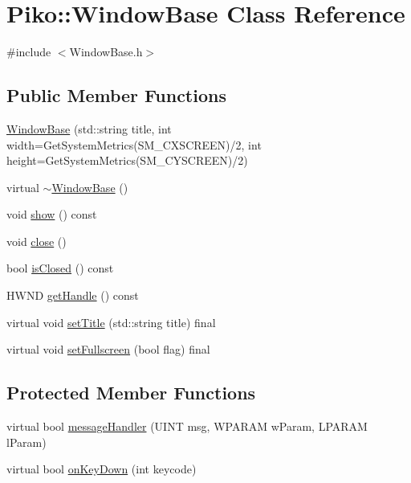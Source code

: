 \hypertarget{class_piko_1_1_window_base}{\section{Piko\-:\-:Window\-Base Class Reference}
\label{d5/d35/class_piko_1_1_window_base}
}


{\ttfamily \#include $<$Window\-Base.\-h$>$}

\subsection*{Public Member Functions}
\begin{DoxyCompactItemize}
\item 
\hyperlink{class_piko_1_1_window_base_aeae412731ab7b4fc7aeaa6a39a05dbd4}{Window\-Base} (std\-::string title, int width=Get\-System\-Metrics(S\-M\-\_\-\-C\-X\-S\-C\-R\-E\-E\-N)/2, int height=Get\-System\-Metrics(S\-M\-\_\-\-C\-Y\-S\-C\-R\-E\-E\-N)/2)
\item 
virtual \hyperlink{class_piko_1_1_window_base_a8e0ff7e2f9de0593ff5f30690c8a1709}{$\sim$\-Window\-Base} ()
\item 
void \hyperlink{class_piko_1_1_window_base_adc2517998fdfcff88f16de67d7fc86e0}{show} () const 
\item 
void \hyperlink{class_piko_1_1_window_base_a191ed08be1048698dc097a9c15738645}{close} ()
\item 
bool \hyperlink{class_piko_1_1_window_base_ae0b863ad65962ea6262fdab2d74932fa}{is\-Closed} () const 
\item 
H\-W\-N\-D \hyperlink{class_piko_1_1_window_base_ade10d9b8547371c89280d3b4921fe85c}{get\-Handle} () const 
\item 
virtual void \hyperlink{class_piko_1_1_window_base_a7a38940a42a19e27dbf2c86d8457c188}{set\-Title} (std\-::string title) final
\item 
virtual void \hyperlink{class_piko_1_1_window_base_ab85a94e05075f628747eea90b8ab319a}{set\-Fullscreen} (bool flag) final
\end{DoxyCompactItemize}
\subsection*{Protected Member Functions}
\begin{DoxyCompactItemize}
\item 
virtual bool \hyperlink{class_piko_1_1_window_base_a71b8febcd8354962939ae885f3a66a4d}{message\-Handler} (U\-I\-N\-T msg, W\-P\-A\-R\-A\-M w\-Param, L\-P\-A\-R\-A\-M l\-Param)
\item 
virtual bool \hyperlink{class_piko_1_1_window_base_abad8721eb7514d09cd86f12df5ebab1d}{on\-Key\-Down} (int keycode)
\end{DoxyCompactItemize}
